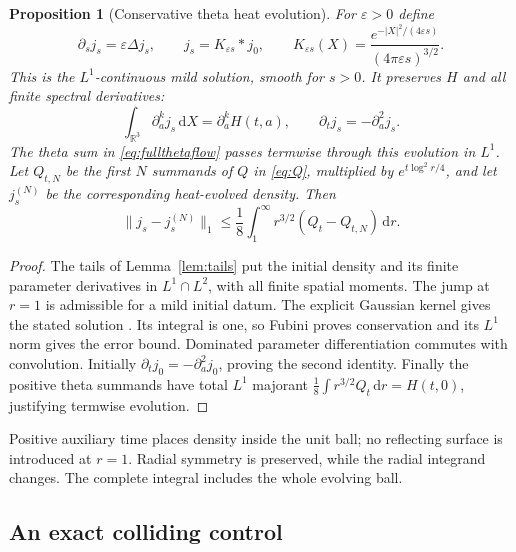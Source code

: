 \documentclass[11pt]{article}
\numberwithin{equation}{section}
\newtheorem{proposition}[theorem]{Proposition}
\newcommand{\dd}{\,\mathrm d}
\begin{document}
\begin{proposition}[Conservative theta heat evolution]\label{prop:conservative}
For $\varepsilon>0$ define
\begin{equation}\label{eq:conservativeheat}
\boxed{\partial_sj_s=\varepsilon\Delta j_s,\qquad
j_s=K_{\varepsilon s}*j_0,\qquad
K_{\varepsilon s}(X)=
 \frac{e^{-|X|^2/(4\varepsilon s)}}{(4\pi\varepsilon s)^{3/2}}.}
\end{equation}
This is the $L^1$-continuous mild solution, smooth for $s>0$.
It preserves $H$ and all finite spectral derivatives:
\begin{equation}\label{eq:conservedjets}
\int_{\mathbb R^3}\partial_a^k j_s\dd X=\partial_a^kH(t,a),
\qquad \partial_tj_s=-\partial_a^2j_s.
\end{equation}
The theta sum in \eqref{eq:fullthetaflow} passes termwise through this
evolution in $L^1$. Let $Q_{t,N}$ be the first $N$ summands of
$Q$ in \eqref{eq:Q}, multiplied by $e^{t\log^2r/4}$, and let
$j_s^{(N)}$ be the corresponding heat-evolved density. Then
\[
\|j_s-j_s^{(N)}\|_1\le
 \frac18\int_1^\infty r^{3/2}(Q_t-Q_{t,N})\dd r.
\]
\end{proposition}

\begin{proof}
The tails of Lemma~\ref{lem:tails} put the initial density and its finite
parameter derivatives in $L^1\cap L^2$, with all finite spatial moments.
The jump at $r=1$ is admissible for a mild initial datum.
The explicit Gaussian kernel gives the stated solution
\cite[Section~5.1]{HunterPDE}. Its integral is one, so Fubini proves
conservation and its $L^1$ norm gives the error bound.
Dominated parameter differentiation commutes with convolution.
Initially $\partial_tj_0=-\partial_a^2j_0$, proving the second identity.
Finally the positive theta summands have total $L^1$ majorant
$\frac18\int r^{3/2}Q_t\dd r=H(t,0)$, justifying termwise evolution.
\end{proof}

Positive auxiliary time places density inside the unit ball; no
reflecting surface is introduced at $r=1$. Radial symmetry is preserved,
while the radial integrand changes. The complete integral includes the
whole evolving ball.

\subsection{An exact colliding control}\label{sec:control}
\end{document}
